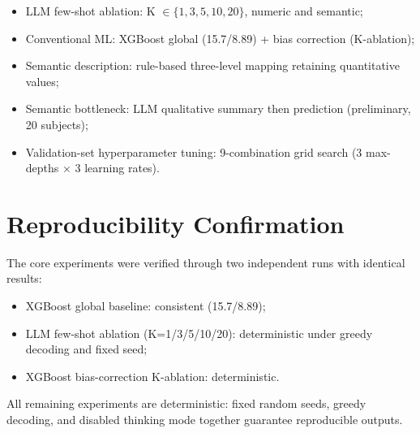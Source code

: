\begin{itemize}
  \item LLM few-shot ablation: K $\in \{1,3,5,10,20\}$, numeric and semantic;
  \item Conventional ML: XGBoost global (15.7/8.89) + bias correction (K-ablation);
  \item Semantic description: rule-based three-level mapping retaining quantitative values;
  \item Semantic bottleneck: LLM qualitative summary then prediction (preliminary, 20 subjects);
  \item Validation-set hyperparameter tuning: 9-combination grid search (3 max-depths $\times$ 3 learning rates).
\end{itemize}

\section{Reproducibility Confirmation}

The core experiments were verified through two independent runs with identical results:

\begin{itemize}
  \item XGBoost global baseline: consistent (15.7/8.89);
  \item LLM few-shot ablation (K=1/3/5/10/20): deterministic under greedy decoding and fixed seed;
  \item XGBoost bias-correction K-ablation: deterministic.
\end{itemize}

All remaining experiments are deterministic: fixed random seeds, greedy decoding, and disabled thinking mode together guarantee reproducible outputs.

